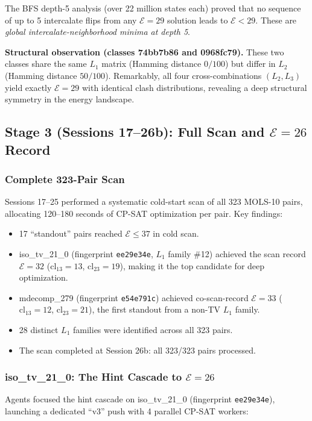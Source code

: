 \documentclass[11pt,a4paper]{article}
\theoremstyle{remark}
\newcommand{\cl}{\mathrm{cl}}
\newcommand{\E}{\mathcal{E}}
\begin{document}
The BFS depth-5 analysis (over 22 million states each) proved that no sequence of up to
5 intercalate flips from any $\E=29$ solution leads to $\E < 29$. These are \emph{global
intercalate-neighborhood minima at depth 5}.

\textbf{Structural observation (classes 74bb7b86 and 0968fc79).} These two classes share
the same $L_1$ matrix (Hamming distance $0/100$) but differ in $L_2$ (Hamming distance
$50/100$). Remarkably, all four cross-combinations $(L_2, L_3)$ yield exactly $\E=29$
with identical clash distributions, revealing a deep structural symmetry in the energy
landscape.

\subsection{Stage 3 (Sessions 17--26b): Full Scan and $\E=26$ Record}

\subsubsection{Complete 323-Pair Scan}

Sessions 17--25 performed a systematic cold-start scan of all 323 MOLS-10 pairs,
allocating 120--180 seconds of CP-SAT optimization per pair. Key findings:
\begin{itemize}[noitemsep]
  \item 17 ``standout'' pairs reached $\E \leq 37$ in cold scan.
  \item iso\_tv\_21\_0 (fingerprint \texttt{ee29e34e}, $L_1$ family \#12) achieved the
    scan record $\E=32$ ($\cl_{13}=13$, $\cl_{23}=19$), making it the top candidate
    for deep optimization.
  \item mdecomp\_279 (fingerprint \texttt{e54e791c}) achieved co-scan-record $\E=33$
    ($\cl_{13}=12$, $\cl_{23}=21$), the first standout from a non-TV $L_1$ family.
  \item 28 distinct $L_1$ families were identified across all 323 pairs.
  \item The scan completed at Session 26b: all 323/323 pairs processed.
\end{itemize}

\subsubsection{iso\_tv\_21\_0: The Hint Cascade to $\E=26$}

Agents focused the hint cascade on iso\_tv\_21\_0 (fingerprint \texttt{ee29e34e}),
launching a dedicated ``v3'' push with 4 parallel CP-SAT workers:
\end{document}

